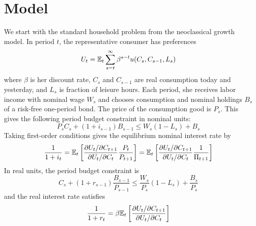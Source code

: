 \section{Model}
We start with the standard household problem from the neoclassical growth model. In period $t$, the representative consumer has preferences $$U_t = \mathbb{E}_t \sum_{s=t}^\infty \beta^{s-t} u(C_s, C_{s-1}, L_s)$$ where $\beta$ is her discount rate, $C_s$ and $C_{s-1}$ are real consumption today and yesterday, and $L_s$ is fraction of leisure hours. Each period, she receives labor income with nominal wage $W_s$ and chooses consumption and nominal holdings $B_s$ of a risk-free one-period bond. The price of the consumption good is $P_s$. This gives the following period budget constraint in nominal units: $$P_s C_s + (1 + i_{s-1})B_{s-1} \leq W_s(1 - L_s) + B_s$$
Taking first-order conditions gives the equilibrium nominal interest rate by
\begin{equation}
\label{nominal-euler}
\frac{1}{1 + i_t} = \mathbb{E}_t \left[  \frac{\partial U_t / \partial C_{t+1}}{\partial U_t / \partial C_t} \frac{P_t}{P_{t+1}}  \right] = \mathbb{E}_t \left[  \frac{\partial U_t / \partial C_{t+1}}{\partial U_t / \partial C_t} \frac{1}{\Pi_{t+1}}  \right]
\end{equation}
In real units, the period budget constraint is $$C_s + (1 + r_{s-1}) \frac{B_{s-1}}{P_{s-1}} \leq \frac{W_s}{P_s}(1 - L_s) + \frac{B_s}{P_s}$$ and the real interest rate satisfies
\begin{equation}
\label{real-euler}
\frac{1}{1 + r_t} = \beta \mathbb{E}_t \left[  \frac{\partial U_t / \partial C_{t+1}}{\partial U_t / \partial C_t}  \right]
\end{equation}

